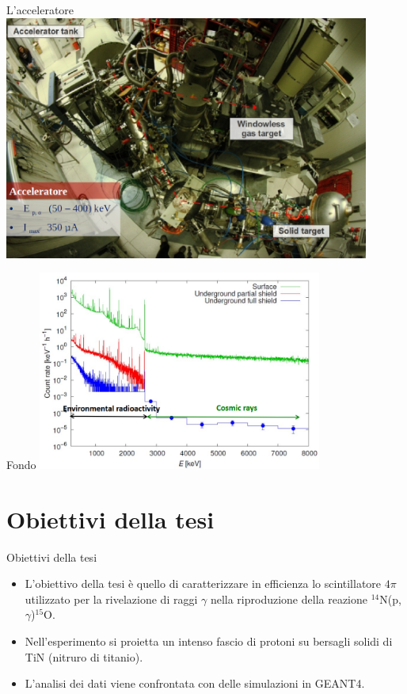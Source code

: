 \documentclass [xcolor=svgnames] {beamer}
\begin{document}
	\begin{frame}{L'acceleratore}
		\centering
		\includegraphics[width=0.9\textwidth]{img/LUNA2.png}
	\end{frame}
	
	\begin{frame}{Fondo}
		\centering
		\includegraphics[width=0.7\textwidth]{img/noise.png}
	\end{frame}
	
	\section{Obiettivi della tesi}
	\begin{frame}{Obiettivi della tesi}
		\begin{itemize}
			\item<1-> L'obiettivo della tesi è quello di caratterizzare in efficienza lo scintillatore $4\pi$ utilizzato per la rivelazione di raggi $\gamma$ nella riproduzione della reazione $^{14}$N(p,$\gamma$)$^{15}$O. 
			\item<2-> Nell'esperimento si proietta un intenso fascio di protoni su bersagli solidi di TiN (nitruro di titanio).  
			\item<3-> L'analisi dei dati viene confrontata con delle simulazioni in GEANT4.
		\end{itemize}
	\end{frame}
\end{document}
